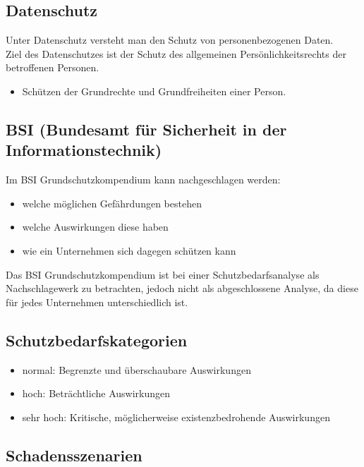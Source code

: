 \documentclass[10pt]{article}
\begin{document}
\subsection{Datenschutz}

Unter Datenschutz versteht man den Schutz von personenbezogenen Daten. \\
Ziel des Datenschutzes ist der Schutz des allgemeinen Persönlichkeitsrechts der betroffenen Personen. \\
\begin{itemize}

\item Schützen der Grundrechte und Grundfreiheiten einer Person.

\end{itemize}

\subsection{BSI (Bundesamt für Sicherheit in der Informationstechnik)}

Im BSI Grundschutzkompendium kann nachgeschlagen werden:
\begin{itemize}
\item welche möglichen Gefährdungen bestehen
\item welche Auswirkungen diese haben
\item wie ein Unternehmen sich dagegen schützen kann
\end{itemize} 
Das BSI Grundschutzkompendium ist bei einer Schutzbedarfsanalyse als Nachschlagewerk zu betrachten, jedoch nicht als abgeschlossene Analyse, da diese für jedes Unternehmen unterschiedlich ist.

\subsection{Schutzbedarfskategorien}

\begin{itemize} 
\item normal: Begrenzte und überschaubare Auswirkungen \\
\item hoch: Beträchtliche Auswirkungen \\
\item sehr hoch: Kritische, möglicherweise existenzbedrohende Auswirkungen
\end{itemize}

\subsection{Schadensszenarien}
\end{document}

